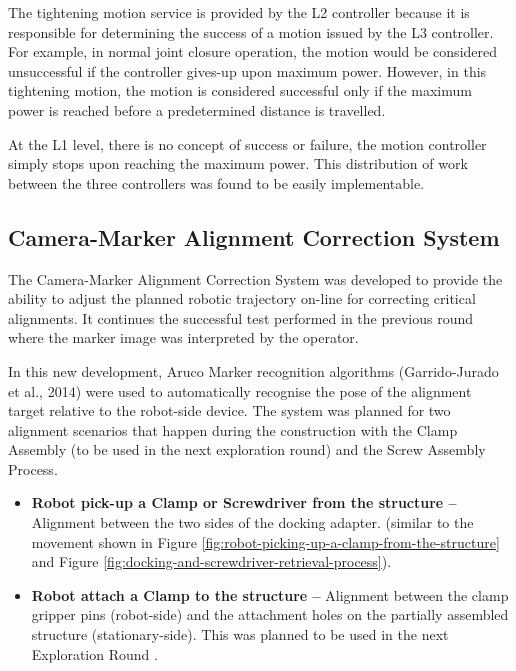 The tightening motion service is provided by the L2 controller because it is responsible for determining the success of a motion issued by the L3 controller. For example, in normal joint closure operation, the motion would be considered unsuccessful if the controller gives-up upon maximum power. However, in this tightening motion, the motion is considered successful only if the maximum power is reached before a predetermined distance is travelled. 

At the L1 level, there is no concept of success or failure, the motion controller simply stops upon reaching the maximum power. This distribution of work between the three controllers was found to be easily implementable.

\subsection{Camera-Marker Alignment Correction System}
\label{subsection:exploration-4-camera-marker-alignment-correction-system}

The Camera-Marker Alignment Correction System was developed to provide the ability to adjust the planned robotic trajectory on-line for correcting critical alignments. It continues the successful test performed in the previous round  where the marker image was interpreted by the operator. 

In this new development, Aruco Marker recognition algorithms (Garrido-Jurado et al., 2014) were used to automatically recognise the pose of the alignment target relative to the robot-side device. The system was planned for two alignment scenarios that happen during the construction with the Clamp Assembly (to be used in the next exploration round) and the Screw Assembly Process. 

\begin{itemize}
    \item \textbf{Robot pick-up a Clamp or Screwdriver from the structure --} Alignment between the two sides of the docking adapter. (similar to the movement shown in Figure \ref{fig:robot-picking-up-a-clamp-from-the-structure} and Figure \ref{fig:docking-and-screwdriver-retrieval-process}).
    \item \textbf{Robot attach a Clamp to the structure --} Alignment between the clamp gripper pins (robot-side) and the attachment holes on the partially assembled structure (stationary-side). This was planned to be used in the next Exploration Round .
\end{itemize}

